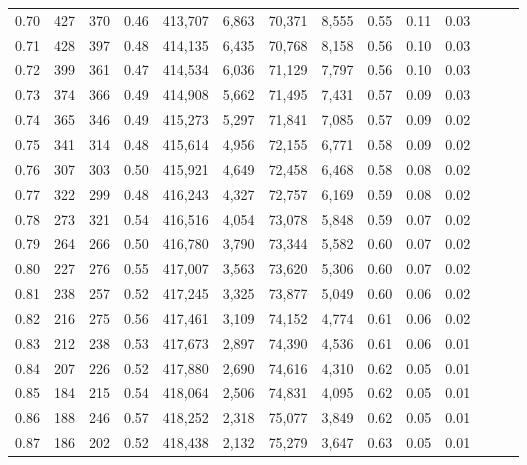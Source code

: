 \begin{tabular}{rrrrrrrrrrrrrr}
0.70 &     427 &    370 &  0.46 &  413,707 &    6,863 &  70,371 &   8,555 &  0.55 &  0.11 &      0.03 \\
0.71 &     428 &    397 &  0.48 &  414,135 &    6,435 &  70,768 &   8,158 &  0.56 &  0.10 &      0.03 \\
0.72 &     399 &    361 &  0.47 &  414,534 &    6,036 &  71,129 &   7,797 &  0.56 &  0.10 &      0.03 \\
0.73 &     374 &    366 &  0.49 &  414,908 &    5,662 &  71,495 &   7,431 &  0.57 &  0.09 &      0.03 \\
0.74 &     365 &    346 &  0.49 &  415,273 &    5,297 &  71,841 &   7,085 &  0.57 &  0.09 &      0.02 \\
0.75 &     341 &    314 &  0.48 &  415,614 &    4,956 &  72,155 &   6,771 &  0.58 &  0.09 &      0.02 \\
0.76 &     307 &    303 &  0.50 &  415,921 &    4,649 &  72,458 &   6,468 &  0.58 &  0.08 &      0.02 \\
0.77 &     322 &    299 &  0.48 &  416,243 &    4,327 &  72,757 &   6,169 &  0.59 &  0.08 &      0.02 \\
0.78 &     273 &    321 &  0.54 &  416,516 &    4,054 &  73,078 &   5,848 &  0.59 &  0.07 &      0.02 \\
0.79 &     264 &    266 &  0.50 &  416,780 &    3,790 &  73,344 &   5,582 &  0.60 &  0.07 &      0.02 \\
0.80 &     227 &    276 &  0.55 &  417,007 &    3,563 &  73,620 &   5,306 &  0.60 &  0.07 &      0.02 \\
0.81 &     238 &    257 &  0.52 &  417,245 &    3,325 &  73,877 &   5,049 &  0.60 &  0.06 &      0.02 \\
0.82 &     216 &    275 &  0.56 &  417,461 &    3,109 &  74,152 &   4,774 &  0.61 &  0.06 &      0.02 \\
0.83 &     212 &    238 &  0.53 &  417,673 &    2,897 &  74,390 &   4,536 &  0.61 &  0.06 &      0.01 \\
0.84 &     207 &    226 &  0.52 &  417,880 &    2,690 &  74,616 &   4,310 &  0.62 &  0.05 &      0.01 \\
0.85 &     184 &    215 &  0.54 &  418,064 &    2,506 &  74,831 &   4,095 &  0.62 &  0.05 &      0.01 \\
0.86 &     188 &    246 &  0.57 &  418,252 &    2,318 &  75,077 &   3,849 &  0.62 &  0.05 &      0.01 \\
0.87 &     186 &    202 &  0.52 &  418,438 &    2,132 &  75,279 &   3,647 &  0.63 &  0.05 &      0.01 \\

\end{tabular}
